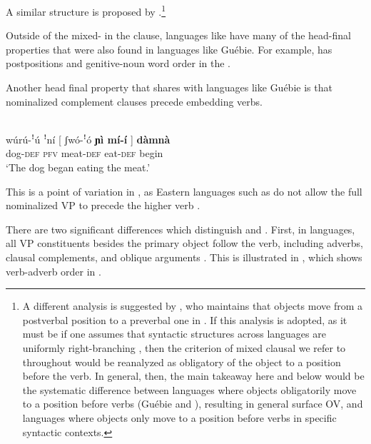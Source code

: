 \documentclass[output=paper,newtxmath,modfonts,nonflat,draftmode]{langsci/langscibook}
\begin{document}
\newpage 
A similar structure is proposed by \citet{nikitina09}.\footnote{\label{koopfn}A different analysis is suggested by \citet{Koopman:1984,koopman92}, who maintains that objects move from a postverbal position to a preverbal one in . If this analysis is adopted, as it must be if one assumes that syntactic structures across languages are uniformly right-branching \citep{kayne94}, then the criterion of mixed clausal  we refer to throughout would be reanalyzed as obligatory  of the object to a position before the verb. In general, then, the main takeaway here and below would be the systematic difference between languages where objects obligatorily move to a position before verbs (Guébie and ), resulting in general surface OV, and languages where objects only move to a position before verbs in specific syntactic contexts.}

Outside of the mixed- in the clause,  languages like  have many of the head-final properties that were also found in  languages like Guébie. For example,  has postpositions  and genitive-noun word order in the  . 

Another head final property that  shares with  languages like Guébie  is that nominalized complement clauses precede embedding verbs.

\ea {}\\
\gll wúrú-ꜝú {ꜝ{ní}} [ {ʃwó-ꜝó} \textbf{{ɲì mí-í}} ] \textbf{{dàmnà}} \\
{dog}-\textsc{def} \textsc{pfv} {} meat-\textsc{def} eat-\textsc{def} {} begin\\
\glt `The dog began eating the meat.'
\z 

This is a point of variation in , as Eastern  languages such as  do not allow the full nominalized VP to precede the higher verb \citep{nikitina09}.

There are two significant differences which distinguish  and . First, in  languages, all VP constituents besides the primary object follow the verb, including adverbs, clausal complements, and oblique arguments \citep{nikitina09}. This is illustrated in , which shows verb-adverb order in .
\end{document}
